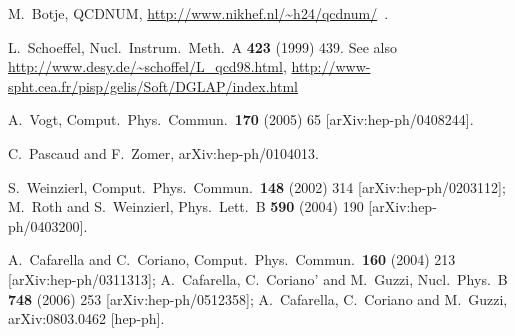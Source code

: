 \documentclass[12pt]{article}
\begin{document}

\begin{thebibliography}{99}

  M.~Botje, QCDNUM, \url{http://www.nikhef.nl/~h24/qcdnum/}~.

L.~Schoeffel,
Nucl.\ Instrum.\ Meth.\ A {\bf 423} (1999) 439.
See also \url{http://www.desy.de/~schoffel/L_qcd98.html},
\url{http://www-spht.cea.fr/pisp/gelis/Soft/DGLAP/index.html}

  A.~Vogt,
  Comput.\ Phys.\ Commun.\  {\bf 170} (2005) 65
  [arXiv:hep-ph/0408244].

C.~Pascaud and F.~Zomer,
arXiv:hep-ph/0104013.


S.~Weinzierl,
Comput.\ Phys.\ Commun.\  {\bf 148} (2002) 314
[arXiv:hep-ph/0203112];
M.~Roth and S.~Weinzierl,
Phys.\ Lett.\ B {\bf 590} (2004) 190
[arXiv:hep-ph/0403200].

 A.~Cafarella and C.~Coriano,
Comput.\ Phys.\ Commun.\  {\bf 160} (2004) 213
[arXiv:hep-ph/0311313];
  A.~Cafarella, C.~Coriano' and M.~Guzzi,
  Nucl.\ Phys.\  B {\bf 748} (2006) 253
  [arXiv:hep-ph/0512358];
  A.~Cafarella, C.~Coriano and M.~Guzzi,
  arXiv:0803.0462 [hep-ph].


\end{thebibliography}
\end{document}
